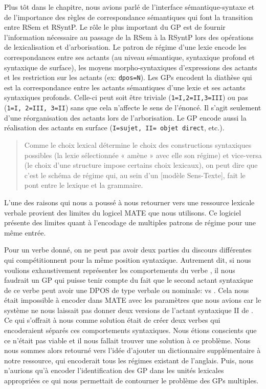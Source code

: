 Plus tôt dans le chapitre, nous avions parlé de l'interface sémantique-syntaxe et de l'importance des règles de correspondance sémantiques qui font la transition entre \ac{RSem} et \ac{RSyntP}. Le rôle le plus important du \ac{GP} est de fournir l'information nécessaire au passage de la \ac{RSem} à la \ac{RSyntP} lors des opérations de lexicalisation et d’arborisation. Le patron de régime d'une lexie encode les correspondances entre ses actants (au niveau sémantique, syntaxique profond et syntaxique de surface), les moyens morpho-syntaxiques d'expressions des actants et les restriction sur les actants (ex: \texttt{dpos=N}). Les \acp{GP} encodent la diathèse qui est la correspondance entre les actants sémantiques d'une lexie et ses actants syntaxiques profonds. Celle-ci peut soit être triviale (\texttt{1=I,2=II,3=III}) ou pas (\texttt{1=I, 2=III, 3=II}) sans que cela n'affecte le sens de l'énoncé. Il s'agit seulement d'une réorganisation des actants lors de l'arborisation. Le \ac{GP} encode aussi la réalisation des actants en surface (\texttt{I=sujet, II= objet direct}, etc.).

\begin{quote}
Comme le choix lexical détermine le choix des constructions syntaxiques possibles (la lexie sélectionnée « amène » avec elle son régime) et vice-versa (le choix d’une structure impose certains choix lexicaux), on peut dire que c’est le schéma de régime qui, au sein d’un [modèle Sens-Texte], fait le pont entre le lexique et la grammaire.
\end{quote}
\vspace{-\baselineskip}
\hfill
\cite[p.~105]{MilicevicSchemaregimepont2009}

L'une des raisons qui nous a poussé à nous retourner vers une ressource lexicale verbale provient des limites du logicel MATE \citep{BohnetDevelopmentEnvironmentMTTbased2000a,BOHNET10,bohnet07} que nous utilisons. Ce logiciel présente des limites quant à l'encodage de multiples patrons de régime pour une même entrée.

Pour un verbe donné, on ne peut pas avoir deux parties du discours différentes qui compétitionnent pour la même position syntaxique. Autrement dit, si nous voulions exhaustivement représenter les comportements du verbe , il nous faudrait un \ac{GP} qui puisse tenir compte du fait que le second actant syntaxique de ce verbe peut avoir une \ac{DPOS} de type verbale ou nominale:  vs . Cela nous était impossible à encoder dans MATE avec les paramètres que nous avions car le système ne nous laissait pas donner deux versions de l'actant syntaxique II de . Ce qui s'offrait à nous comme solution était de créer deux verbes  qui encoderaient séparés ces comportements syntaxiques. Nous étions conscients que ce n'était pas viable et il nous fallait trouver une solution à ce problème. Nous nous sommes alors retourné vers l'idée d'ajouter un dictionnaire supplémentaire à notre ressource, qui encoderait tous les régimes existant de l'anglais. Puis, nous n'aurions qu'à encoder l'identification des \ac{GP} dans les unités lexicales appropriées ce qui nous permettait de contourner le problème des \acp{GP} multiples.

